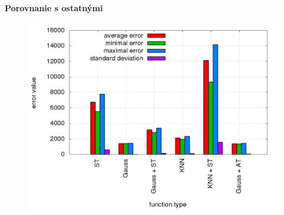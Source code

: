 \documentclass[xcolor=dvipsnames]{beamer}
\begin{document}
\begin{frame}{\bf Porovnanie s ostatnými}

\begin{figure}[!htb]
\centering
\includegraphics[scale=.4]{../../results_q_learning/map_2/trials_average_results.png}
\end{figure}

\end{frame}
\end{document}
